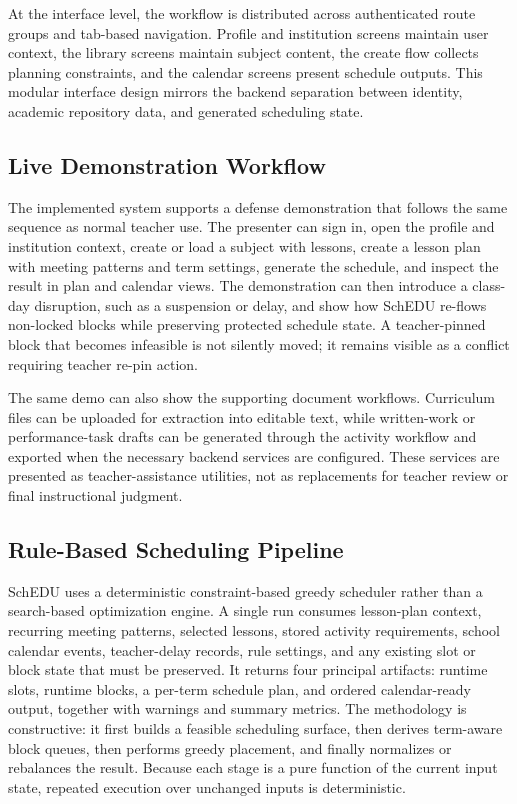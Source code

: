 \documentclass[conference]{IEEEtran}
\begin{document}
At the interface level, the workflow is distributed across authenticated route
groups and tab-based navigation. Profile and institution screens maintain user
context, the library screens maintain subject content, the create flow collects
planning constraints, and the calendar screens present schedule outputs. This
modular interface design mirrors the backend separation between identity, academic
repository data, and generated scheduling state.

\subsection{Live Demonstration Workflow}

The implemented system supports a defense demonstration that follows the same
sequence as normal teacher use. The presenter can sign in, open the profile and
institution context, create or load a subject with lessons, create a lesson plan
with meeting patterns and term settings, generate the schedule, and inspect the
result in plan and calendar views. The demonstration can then introduce a
class-day disruption, such as a suspension or delay, and show how SchEDU re-flows
non-locked blocks while preserving protected schedule state. A teacher-pinned
block that becomes infeasible is not silently moved; it remains visible as a
conflict requiring teacher re-pin action.

The same demo can also show the supporting document workflows. Curriculum files
can be uploaded for extraction into editable text, while written-work or
performance-task drafts can be generated through the activity workflow and
exported when the necessary backend services are configured. These services are
presented as teacher-assistance utilities, not as replacements for teacher
review or final instructional judgment.

\subsection{Rule-Based Scheduling Pipeline}

SchEDU uses a deterministic constraint-based greedy scheduler rather than a
search-based optimization engine. A single run consumes lesson-plan context,
recurring meeting patterns, selected lessons, stored activity requirements,
school calendar events, teacher-delay records, rule settings, and any existing
slot or block state that must be preserved. It returns four principal artifacts:
runtime slots, runtime blocks, a per-term schedule plan, and ordered
calendar-ready output, together with warnings and summary metrics. The
methodology is constructive: it first builds a feasible scheduling surface, then
derives term-aware block queues, then performs greedy placement, and finally
normalizes or rebalances the result. Because each stage is a pure function of
the current input state, repeated execution over unchanged inputs is
deterministic.
\end{document}

